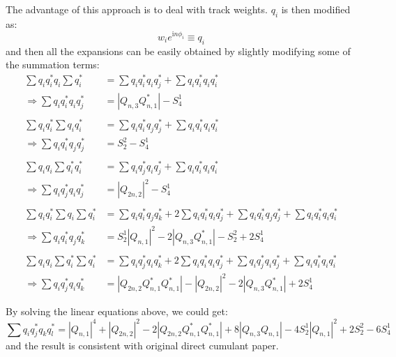 The advantage of this approach is to deal with track weights. $q_{i}$ is then modified as:
\begin{equation}
w_{i}e^{\text{i}n\phi_i}\equiv q_{i}
\end{equation}
and then all the expansions can be easily obtained by slightly modifying some of the summation terms:
\begin{equation}
\begin{split}
\sum q_{i}^{}q_{i}^{*}q_{i}^{} \sum q_{i}^{*} &= \sum q_{i}^{}q_{i}^{*}q_{i}^{}q_{j}^{*} + \sum q_{i}^{}q_{i}^{*}q_{i}^{}q_{i}^{*} \\
\Rightarrow \sum q_{i}^{}q_{i}^{*}q_{i}^{}q_{j}^{*} &= |Q_{n,3}^{}Q_{n,1}^{*}|-S_{4}^{1} \\
& \\
\sum q_{i}^{}q_{i}^{*}\sum q_{i}^{}q_{i}^{*} &= \sum q_{i}^{}q_{i}^{*}q_{j}^{}q_{j}^{*} + \sum q_{i}^{}q_{i}^{*}q_{i}^{}q_{i}^{*} \\
\Rightarrow \sum q_{i}^{}q_{i}^{*}q_{j}^{}q_{j}^{*} &= S_{2}^{2}-S_{4}^{1} \\
& \\
\sum q_{i}^{}q_{i}^{} \sum q_{i}^{*}q_{i}^{*} &= \sum q_{i}^{}q_{j}^{*}q_{i}^{}q_{j}^{*} + \sum q_{i}^{}q_{i}^{*}q_{i}^{}q_{i}^{*} \\
\Rightarrow \sum q_{i}^{}q_{j}^{*}q_{i}^{}q_{j}^{*} &= |Q_{2n,2}|^{2}-S_{4}^{1} \\
& \\
\sum q_{i}^{}q_{i}^{*} \sum q_{i}^{} \sum q_{i}^{*} &= \sum q_{i}^{}q_{i}^{*}q_{j}^{}q_{k}^{*} + 2 \sum q_{i}^{}q_{i}^{*}q_{i}^{}q_{j}^{*} + \sum q_{i}^{}q_{i}^{*}q_{j}^{}q_{j}^{*} + \sum q_{i}^{}q_{i}^{*}q_{i}^{}q_{i}^{*} \\
\Rightarrow \sum q_{i}^{}q_{i}^{*}q_{j}^{}q_{k}^{*} &= S_{2}^{1}|Q_{n,1}|^{2}-2|Q_{n,3}^{}Q_{n,1}^{*}|-S_{2}^{2}+2S_{4}^{1} \\
& \\
\sum q_{i}^{}q_{i}^{}\sum q_{i}^{*}\sum q_{i}^{*} &= \sum q_{i}^{}q_{j}^{*}q_{i}^{}q_{k}^{*} + 2\sum q_{i}^{}q_{i}^{*}q_{i}^{}q_{j}^{*} + \sum q_{i}^{}q_{j}^{*}q_{i}^{}q_{j}^{*} + \sum q_{i}^{}q_{i}^{*}q_{i}^{}q_{i}^{*} \\
\Rightarrow \sum q_{i}^{}q_{j}^{*}q_{i}^{}q_{k}^{*} &= |Q_{2n,2}^{}Q_{n,1}^{*}Q_{n,1}^{*}|-|Q_{2n,2}|^{2}-2|Q_{n,3}^{}Q_{n,1}^{*}|+2S_{4}^{1}
\end{split}
\end{equation}

By solving the linear equations above, we could get:
\begin{equation}
\sum q_{i}^{}q_{j}^{*}q_{k}^{}q_{l}^{*} = |Q_{n,1}|^{4}+|Q_{2n,2}|^{2}-2|Q_{2n,2}^{}Q_{n,1}^{*}Q_{n,1}^{*}|+8|Q_{n,3}^{}Q_{n,1}|-4S_{2}^{1}|Q_{n,1}|^{2}+2S_{2}^{2}-6S_{4}^{1}
\end{equation}
and the result is consistent with original direct cumulant paper.

